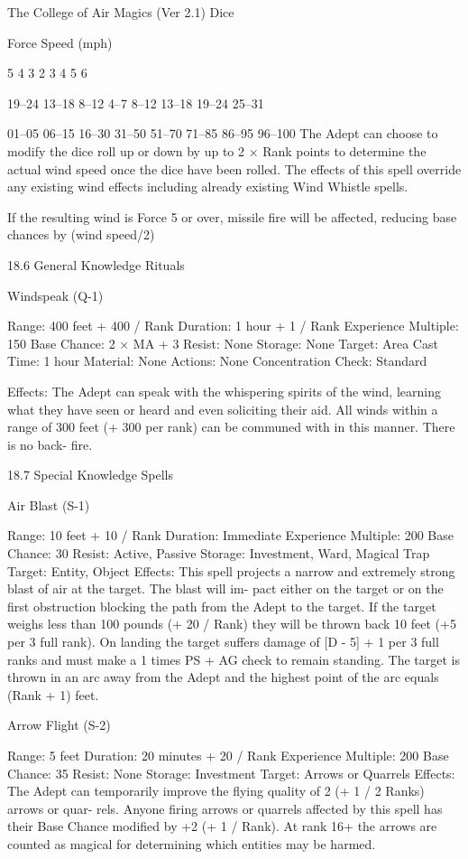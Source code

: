 \begin{Chapter}{The College of Air Magics (Ver 2.1)}
Dice 

Force  Speed (mph) 

5 
4 
3 
2 
3 
4 
5 
6 

19–24 
13–18 
8–12 
4–7 
8–12 
13–18 
19–24 
25–31 

01–05 
06–15 
16–30 
31–50 
51–70 
71–85 
86–95 
96–100 
The Adept can choose to modify the dice roll up or 
down  by  up  to  2  ×  Rank  points  to  determine  the 
actual  wind  speed  once  the  dice  have  been  rolled. 
The effects of this spell override any existing wind 
effects  including  already  existing  Wind  Whistle 
spells. 

If the resulting wind is Force 5 or over, missile fire 
will  be  affected,  reducing  base  chances  by  (wind 
speed/2)%

18.6 General Knowledge Rituals 

Windspeak (Q-1) 

Range: 400 feet + 400 / Rank 
Duration: 1 hour + 1 / Rank 
Experience Multiple: 150 
Base Chance: 2 × MA + 3%
Resist: None 
Storage: None 
Target: Area 
Cast Time: 1 hour 
Material: None 
Actions: None 
Concentration Check: Standard 

Effects:  The  Adept  can  speak  with  the  whispering 
spirits of the wind, learning what they have seen or 
heard  and  even  soliciting  their  aid.  All  winds 
within a range of 300 feet (+ 300 per rank) can be 
communed  with in this  manner.  There  is  no  back-
fire. 

18.7 Special Knowledge Spells 

Air Blast (S-1) 

Range: 10 feet + 10 / Rank 
Duration: Immediate 
Experience Multiple: 200 
Base Chance: 30%
Resist: Active, Passive 
Storage: Investment, Ward, Magical Trap 
Target: Entity, Object 
Effects: This spell projects a narrow and extremely 
strong  blast  of  air  at  the  target.  The  blast  will  im-
pact  either  on the  target  or  on the  first  obstruction 
blocking  the  path  from  the  Adept  to  the  target.  If 
the  target  weighs  less  than  100  pounds  (+  20  / 
Rank)  they  will  be  thrown  back  10  feet  (+5  per  3 
full rank). On landing the target suffers damage of 
[D  -  5]  +  1  per  3  full  ranks  and  must  make  a  1 
times  PS  +  AG  check  to  remain  standing.  The 
target is thrown in an arc away from the Adept and 
the highest point of the arc equals (Rank + 1) feet. 

Arrow Flight (S-2) 

Range: 5 feet 
Duration: 20 minutes + 20 / Rank 
Experience Multiple: 200 
Base Chance: 35%
Resist: None 
Storage: Investment 
Target: Arrows or Quarrels 
Effects:  The  Adept  can  temporarily  improve  the 
flying quality of 2 (+ 1 / 2 Ranks) arrows or quar-
rels.  Anyone  firing  arrows  or  quarrels  affected  by 
this  spell  has  their Base  Chance  modified by  +2%
(+ 1 / Rank). At rank 16+ the arrows are counted as 
magical  for  determining  which  entities  may  be 
harmed. 


\end{Chapter}
